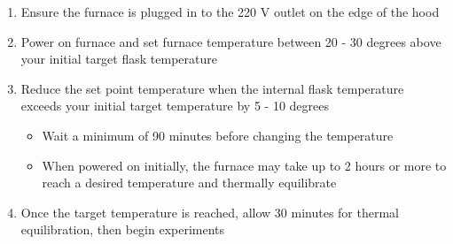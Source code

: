 \documentclass[letterpaper,11pt]{article}
\begin{document}
\begin{enumerate}
    \item Ensure the furnace is plugged in to the 220 V outlet on the edge of 
        the hood %
    \item Power on furnace and set furnace temperature between 20 - 30 degrees 
        above your initial target flask temperature 
    \item Reduce the set point temperature when the internal flask temperature 
        exceeds your initial target temperature by 5 - 10 degrees 
        \begin{itemize}
        \item Wait a minimum of 90 minutes before changing the temperature
        \item When powered on initially, the furnace may take up to 2 hours or   
            more to reach a desired temperature and thermally equilibrate
        \end{itemize}
    
    \item Once the target temperature is reached, allow 30 minutes for thermal 
        equilibration, then begin experiments
    \end{enumerate}
    
\end{document}

